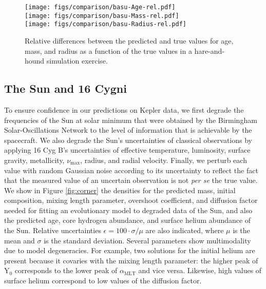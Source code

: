 \documentclass[twocolumn,twocolappendix]{aastex6}
\newcommand{\colwidth}{\linewidth}
\begin{document}
\begin{figure}
    \centering
    \texttt{[image: figs/comparison/basu-Age-rel.pdf]}\\
    \texttt{[image: figs/comparison/basu-Mass-rel.pdf]}\\
    \texttt{[image: figs/comparison/basu-Radius-rel.pdf]}
    \caption{Relative differences between the predicted and true values for age, mass, and radius as a function of the true values in a hare-and-hound simulation exercise.%
    \label{fig:hare-comparison}}
\end{figure}


\subsection{The Sun and 16 Cygni}
To ensure confidence in our predictions on Kepler data, we first degrade the frequencies of the Sun at solar minimum that were obtained by the Birmingham Solar-Oscillations Network \citep[BiSON;][]{2014MNRAS.439.2025D} to the level of information that is achievable by the spacecraft. We also degrade the Sun's uncertainties of classical observations by applying 16 Cyg B's uncertainties of effective temperature, luminosity, surface gravity, metallicity, $\nu_{\max}$, radius, and radial velocity. Finally, we perturb each value with random Gaussian noise according to its uncertainty to reflect the fact that the measured value of an uncertain observation is not \emph{per se} the true value. We show in Figure \ref{fig:corner} the densities for the predicted mass, initial composition, mixing length parameter, overshoot coefficient, and diffusion factor needed for fitting an evolutionary model to degraded data of the Sun, and also the predicted age, core hydrogen abundance, and surface helium abundance of the Sun. Relative uncertainties $\epsilon=100\cdot\sigma/\mu$ are also indicated, where $\mu$ is the mean and $\sigma$ is the standard deviation. Several parameters show multimodality due to model degeneracies. For example, two solutions for the initial helium are present because it covaries with the mixing length parameter: the higher peak of Y$_0$ corresponds to the lower peak of $\alpha_{\text{MLT}}$ and vice versa. Likewise, high values of surface helium correspond to low values of the diffusion factor. 
\end{document}
